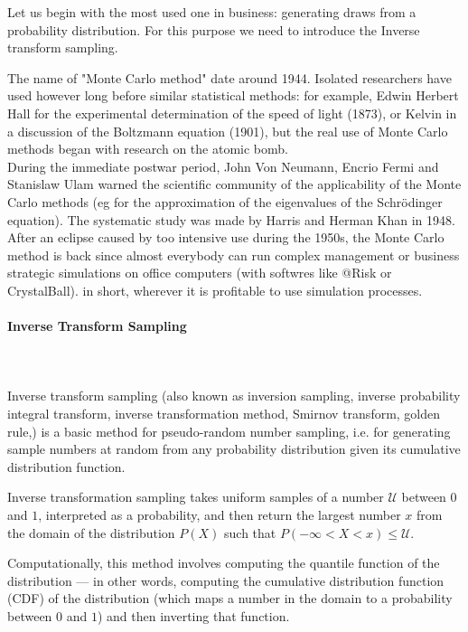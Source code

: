 	Let us begin with the most used one in business: generating draws from a probability distribution. For this purpose we need to introduce the Inverse transform sampling.
	
	\begin{tcolorbox}[title=Remark,colframe=black,arc=10pt]
	The name of "Monte Carlo method" date around 1944. Isolated researchers have used however long before similar statistical methods: for example, Edwin Herbert Hall for the experimental determination of the speed of light (1873), or Kelvin in a discussion of the Boltzmann equation (1901), but the real use of Monte Carlo methods began with research on the atomic bomb.\\

	During the immediate postwar period, John Von Neumann, Encrio Fermi and Stanislaw Ulam warned the scientific community of the applicability of the Monte Carlo methods (eg for the approximation of the eigenvalues of the Schrödinger equation). The systematic study was made by Harris and Herman Khan in 1948. After an eclipse caused by too intensive use during the 1950s, the Monte Carlo method is back since almost everybody can run complex management or business strategic simulations on office computers (with softwres like @Risk or CrystalBall).  in short, wherever it is profitable to use simulation processes.
	\end{tcolorbox}
	
	\pagebreak
	\paragraph{Inverse Transform Sampling}\mbox{}\\\\
	Inverse transform sampling (also known as inversion sampling,  inverse probability integral transform, inverse transformation method, Smirnov transform, golden rule,) is a basic method for pseudo-random number sampling, i.e. for generating sample numbers at random from any probability distribution given its cumulative distribution function.
	
	Inverse transformation sampling takes uniform samples of a number $\mathcal{U}$ between $0$ and $1$, interpreted as a probability, and then return the largest number $x$ from the domain of the distribution $P(X)$ such that $P(-\infty < X < x) \le \mathcal{U}$. 
	
	Computationally, this method involves computing the quantile function of the distribution — in other words, computing the cumulative distribution function (CDF) of the distribution (which maps a number in the domain to a probability between $0$ and $1$) and then inverting that function.
	
